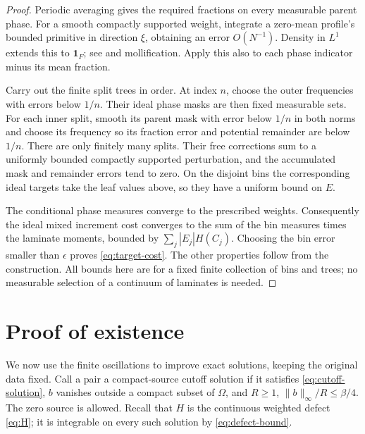 \documentclass[11pt]{article}
\theoremstyle{remark}
\newcommand{\ind}{\mathbf 1}
\newcommand{\norm}[2]{\lVert #1\rVert_{#2}}
\begin{document}
\begin{proof}
Periodic averaging gives the required fractions on every measurable
parent phase. For a smooth compactly supported weight, integrate a
zero-mean profile's bounded primitive in direction $\xi$, obtaining
an error $O(N^{-1})$. Density in $L^1$ extends this to $\ind_F$;
see \cite[Theorem 4.12]{Brezis} and mollification. Apply this also
to each phase indicator minus its mean fraction.

Carry out the finite split trees in order. At index $n$, choose the
outer frequencies with errors below $1/n$. Their ideal phase masks
are then fixed measurable sets. For each inner split, smooth its
parent mask with error below $1/n$ in both norms and choose its
frequency so its fraction error and potential remainder are below
$1/n$. There are only finitely many splits. Their free corrections
sum to a uniformly bounded compactly supported perturbation, and
the accumulated mask and remainder errors tend to zero.
On the disjoint bins the corresponding ideal targets take the leaf
values above, so they have a uniform bound on $E$.

The conditional phase measures converge to the prescribed weights.
Consequently the ideal mixed increment cost converges to the sum of
the bin measures times the laminate moments, bounded by
$\sum_j|E_j|H(C_j)$. Choosing the bin error smaller than
$\epsilon$ proves \eqref{eq:target-cost}. The other properties
follow from the construction. All bounds here are for a fixed finite
collection of bins and trees; no measurable selection of a continuum
of laminates is needed.
\end{proof}

\section{Proof of existence}\label{sec:proof}

We now use the finite oscillations to improve exact solutions, keeping the
original data fixed. Call a pair a compact-source cutoff solution if it
satisfies \eqref{eq:cutoff-solution}, $b$ vanishes outside a compact subset
of $\Omega$, and $R\ge1$, $\norm{b}{\infty}/R\le\beta/4$.
The zero source is allowed. Recall that $H$ is the continuous weighted
defect \eqref{eq:H}; it is integrable on every such solution by
\eqref{eq:defect-bound}.
\end{document}
